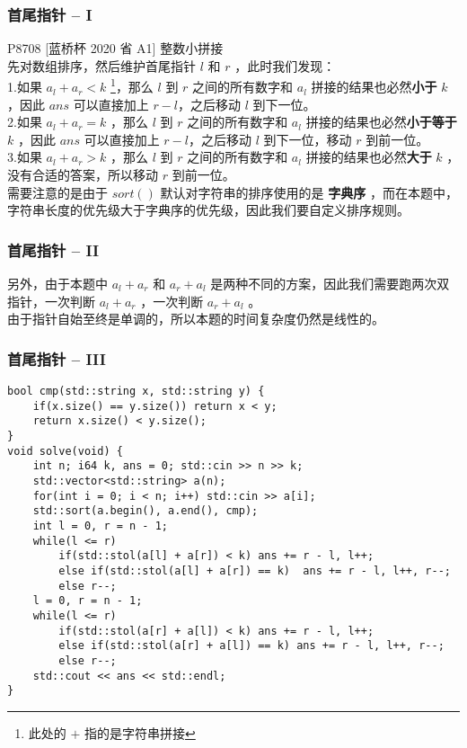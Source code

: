 \documentclass{beamer}
\newcommand{\fdf}[1]{\alert{\textbf{#1}}}
\begin{document}
\begin{frame}
\frametitle{首尾指针 -- I}
P8708 [蓝桥杯 2020 省 A1] 整数小拼接 \\ 
先对数组排序，然后维护首尾指针 $l$ 和 $r$ ，此时我们发现：\\ 
1.如果 $a_l + a_r < k$ \footnote{此处的 $+$ 指的是字符串拼接}，那么 $l$ 到 $r$ 之间的所有数字和 $a_l$ 拼接的结果也必然\fdf{小于} $k$ ，因此 $ans$ 可以直接加上 $r - l$，之后移动 $l$ 到下一位。 \\ 
2.如果 $a_l + a_r = k$ ，那么 $l$ 到 $r$ 之间的所有数字和 $a_l$ 拼接的结果也必然\fdf{小于等于} $k$ ，因此 $ans$ 可以直接加上 $r - l$，之后移动 $l$ 到下一位，移动 $r$ 到前一位。\\
3.如果 $a_l + a_r > k$ ，那么 $l$ 到 $r$ 之间的所有数字和 $a_l$ 拼接的结果也必然\fdf{大于} $k$ ，没有合适的答案，所以移动 $r$ 到前一位。 \\ 
需要注意的是由于 $sort()$ 默认对字符串的排序使用的是 \fdf{字典序} ，而在本题中，字符串长度的优先级大于字典序的优先级，因此我们要自定义排序规则。
\end{frame}
\begin{frame}
\frametitle{首尾指针 -- II}
另外，由于本题中 $a_l + a_r$ 和 $a_r + a_l$ 是两种不同的方案，因此我们需要跑两次双指针，一次判断 $a_l + a_r$ ，一次判断 $a_r + a_l$ 。 \\ 
由于指针自始至终是单调的，所以本题的时间复杂度仍然是线性的。
\end{frame}
\begin{frame}[fragile]
\frametitle{首尾指针 -- III}
\begin{onlyenv}
\begin{verbatim}
bool cmp(std::string x, std::string y) {
    if(x.size() == y.size()) return x < y;
    return x.size() < y.size();
}
void solve(void) {
    int n; i64 k, ans = 0; std::cin >> n >> k;
    std::vector<std::string> a(n);
    for(int i = 0; i < n; i++) std::cin >> a[i];
    std::sort(a.begin(), a.end(), cmp);
    int l = 0, r = n - 1;
    while(l <= r)
        if(std::stol(a[l] + a[r]) < k) ans += r - l, l++;
        else if(std::stol(a[l] + a[r]) == k)  ans += r - l, l++, r--;
        else r--;
    l = 0, r = n - 1;
    while(l <= r) 
        if(std::stol(a[r] + a[l]) < k) ans += r - l, l++;
        else if(std::stol(a[r] + a[l]) == k) ans += r - l, l++, r--;
        else r--;
    std::cout << ans << std::endl;
}
\end{verbatim}
\end{onlyenv}
\end{frame}
\end{document}
